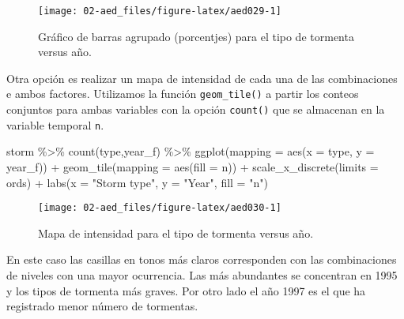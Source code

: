 \documentclass[
]{book}
\newenvironment{Shaded}{\begin{snugshade}}{\end{snugshade}}
\newcommand{\AttributeTok}[1]{\textcolor[rgb]{0.77,0.63,0.00}{#1}}
\newcommand{\FunctionTok}[1]{\textcolor[rgb]{0.00,0.00,0.00}{#1}}
\newcommand{\NormalTok}[1]{#1}
\newcommand{\SpecialCharTok}[1]{\textcolor[rgb]{0.00,0.00,0.00}{#1}}
\newcommand{\StringTok}[1]{\textcolor[rgb]{0.31,0.60,0.02}{#1}}
\begin{document}
\begin{figure}

{\centering \texttt{[image: 02-aed\_files/figure-latex/aed029-1]} 

}

\caption{Gráfico de barras agrupado (porcentjes) para el tipo de tormenta versus año.}\label{fig:aed029}
\end{figure}

Otra opción es realizar un mapa de intensidad de cada una de las combinaciones e ambos factores. Utilizamos la función \texttt{geom\_tile()} a partir los conteos conjuntos para ambas variables con la opción \texttt{count()} que se almacenan en la variable temporal \texttt{n}.

\begin{Shaded}
\begin{Highlighting}[]
\NormalTok{storm }\SpecialCharTok{\%\textgreater{}\%}
    \FunctionTok{count}\NormalTok{(type,year\_f) }\SpecialCharTok{\%\textgreater{}\%}
    \FunctionTok{ggplot}\NormalTok{(}\AttributeTok{mapping =} \FunctionTok{aes}\NormalTok{(}\AttributeTok{x =}\NormalTok{ type, }\AttributeTok{y =}\NormalTok{ year\_f)) }\SpecialCharTok{+} 
        \FunctionTok{geom\_tile}\NormalTok{(}\AttributeTok{mapping =} \FunctionTok{aes}\NormalTok{(}\AttributeTok{fill =}\NormalTok{ n)) }\SpecialCharTok{+} 
        \FunctionTok{scale\_x\_discrete}\NormalTok{(}\AttributeTok{limits =}\NormalTok{ ords) }\SpecialCharTok{+}
        \FunctionTok{labs}\NormalTok{(}\AttributeTok{x =} \StringTok{"Storm type"}\NormalTok{, }\AttributeTok{y =} \StringTok{"Year"}\NormalTok{, }\AttributeTok{fill =} \StringTok{"n"}\NormalTok{)}
\end{Highlighting}
\end{Shaded}

\begin{figure}

{\centering \texttt{[image: 02-aed\_files/figure-latex/aed030-1]} 

}

\caption{Mapa de intensidad para el tipo de tormenta versus año.}\label{fig:aed030}
\end{figure}

En este caso las casillas en tonos más claros corresponden con las combinaciones de niveles con una mayor ocurrencia. Las más abundantes se concentran en 1995 y los tipos de tormenta más graves. Por otro lado el año 1997 es el que ha registrado menor número de tormentas.
\end{document}
